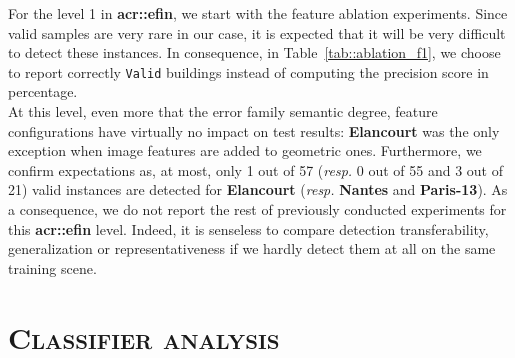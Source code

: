         For the level 1 in \textbf{\gls{acr::efin}}, we start with the feature ablation experiments.
        Since valid samples are very rare in our case, it is expected that it will be very difficult to detect these instances.
        In consequence, in Table~\ref{tab::ablation_f1}, we choose to report correctly \texttt{Valid} buildings instead of computing the precision score in percentage.\\
            
        At this level, even more that the error family semantic degree, feature configurations have virtually no impact on test results: \textbf{Elancourt} was the only exception when image features are added to geometric ones.
        Furthermore, we confirm expectations as, at most, only 1 out of 57 (\textit{resp.} 0 out of 55 and 3 out of 21) valid instances are detected for \textbf{Elancourt} (\textit{resp.} \textbf{Nantes} and \textbf{Paris-13}).
        As a consequence, we do not report the rest of previously conducted experiments for this \textbf{\gls{acr::efin}} level.
        Indeed, it is senseless to compare detection transferability, generalization or representativeness if we hardly detect them at all on the same training scene.

\section{\textsc{Classifier analysis}}
